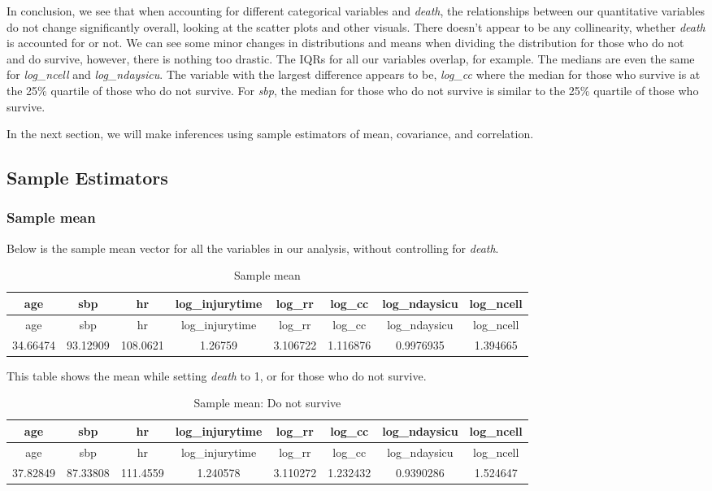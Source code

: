 \documentclass[
]{article}
\begin{document}
In conclusion, we see that when accounting for different categorical
variables and \emph{death}, the relationships between our quantitative
variables do not change significantly overall, looking at the scatter
plots and other visuals. There doesn't appear to be any collinearity,
whether \emph{death} is accounted for or not. We can see some minor
changes in distributions and means when dividing the distribution for
those who do not and do survive, however, there is nothing too drastic.
The IQRs for all our variables overlap, for example. The medians are
even the same for \emph{log\_ncell} and \emph{log\_ndaysicu}. The
variable with the largest difference appears to be, \emph{log\_cc} where
the median for those who survive is at the 25\% quartile of those who do
not survive. For \emph{sbp}, the median for those who do not survive is
similar to the 25\% quartile of those who survive.

In the next section, we will make inferences using sample estimators of
mean, covariance, and correlation.

\newpage

\hypertarget{sample-estimators}{%
\subsection{Sample Estimators}\label{sample-estimators}}

\hypertarget{sample-mean}{%
\subsubsection{Sample mean}\label{sample-mean}}

Below is the sample mean vector for all the variables in our analysis,
without controlling for \emph{death}.

\begin{longtable}[]{@{}cccccccc@{}}
\caption{Sample mean}\tabularnewline
\toprule
age & sbp & hr & log\_injurytime & log\_rr & log\_cc & log\_ndaysicu &
log\_ncell\tabularnewline
\midrule
\endfirsthead
\toprule
age & sbp & hr & log\_injurytime & log\_rr & log\_cc & log\_ndaysicu &
log\_ncell\tabularnewline
\midrule
\endhead
34.66474 & 93.12909 & 108.0621 & 1.26759 & 3.106722 & 1.116876 &
0.9976935 & 1.394665\tabularnewline
\bottomrule
\end{longtable}

This table shows the mean while setting \emph{death} to 1, or for those
who do not survive.

\begin{longtable}[]{@{}cccccccc@{}}
\caption{Sample mean: Do not survive}\tabularnewline
\toprule
age & sbp & hr & log\_injurytime & log\_rr & log\_cc & log\_ndaysicu &
log\_ncell\tabularnewline
\midrule
\endfirsthead
\toprule
age & sbp & hr & log\_injurytime & log\_rr & log\_cc & log\_ndaysicu &
log\_ncell\tabularnewline
\midrule
\endhead
37.82849 & 87.33808 & 111.4559 & 1.240578 & 3.110272 & 1.232432 &
0.9390286 & 1.524647\tabularnewline
\bottomrule
\end{longtable}
\end{document}
